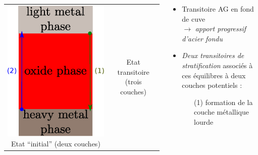 \begin{frame}
\begin{columns}[T]
\begin{column}{0.5\textwidth}
\begin{tabularx}{\textwidth}{CC}
	\includegraphics[height=0.30\textheight]{Figures/schema_stratif_3.eps} \n
	\tiny Etat ``initial'' (deux couches) & \tiny Etat transitoire (trois couches)
	\end{tabularx}
	\end{column}
	\begin{column}{0.55\textwidth} 
	\hskip -0.7cm \begin{minipage}{1.1\textwidth}
	\begin{itemize}
	\item Transitoire AG en fond de cuve \\ $\rightarrow$ \emph{apport progressif d'acier fondu}
	\item \emph{Deux transitoires de stratification} associés à ces équilibres à deux couches potentiels :
	\begin{itemize}
	\item[\textcolor{OliveGreen}{(1)}] formation de la couche métallique lourde \\

\end{itemize}
\end{itemize}
\end{minipage}
\end{column}
\end{columns}
\end{frame}
